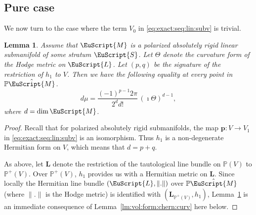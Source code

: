 \documentclass[JEP,XML,SOM,Unicode]{cedram}
\let\mathcal\EuScript
\theoremstyle{plain}
\newtheorem{Lemma}[Theorem]{Lemma}
\theoremstyle{definition}
\newcommand{\Pb}{\mathbb{P}}
\newcommand{\Lb}{\mathbf{L}}
\newcommand{\pp}{\boldsymbol{p}}
\newcommand{\cL}{\mathcal{L}}
\newcommand{\cM}{\mathcal{M}}
\newcommand{\cS}{\mathcal{S}}
\begin{document}
\subsection{Pure case}\label{sec:vol:form:pure}
We now turn to the case where the term $V_0$ in \eqref{eq:exact:seq:lin:subv} is trivial.
\begin{Lemma}\label{lm:vol:form:n:Chern:cl}
Assume that $\cM$ is a polarized absolutely rigid linear submanifold of some stratum $\cS$.
Let $\Theta$ denote the curvature form of the Hodge metric on $\cL$.
Let $(p,q)$ be the signature of the restriction of $h_1$ to $V$.
Then we have the following equality at every point in $\Pb\hat{\cM}$.
\[ d\mu=\frac{(-1)^{p-1}2\pi}{2^dd!}\,(\imath\Theta)^{d-1},\]
where $d=\dim\cM$.
\end{Lemma}
\begin{proof}
Recall that for polarized absolutely rigid submanifolds, the map $\pp:V \to V_1$ in \eqref{eq:exact:seq:lin:subv} is an isomorphism.
Thus $h_1$ is a non-degenerate Hermitian form on $V$, which means that $d=p+q$.

As above, let $\Lb$ denote the restriction of the tautological line bundle on $\Pb(V)$ to $\Pb^+(V)$. Over $\Pb^+(V)$, $h_1$ provides us with a Hermitian metric on $\Lb$.
Since locally the Hermitian line bundle $(\cL,\|.\|)$ over $\Pb\hat{\cM}$ (where $\|.\|$ is the Hodge metric) is identified with $(\Lb_{\Pb^+(V)},h_1)$, Lemma~\ref{lm:vol:form:n:Chern:cl} is an immediate consequence of Lemma~\ref{lm:vol:form:chern:curv} here below.
\end{proof}
\end{document}
